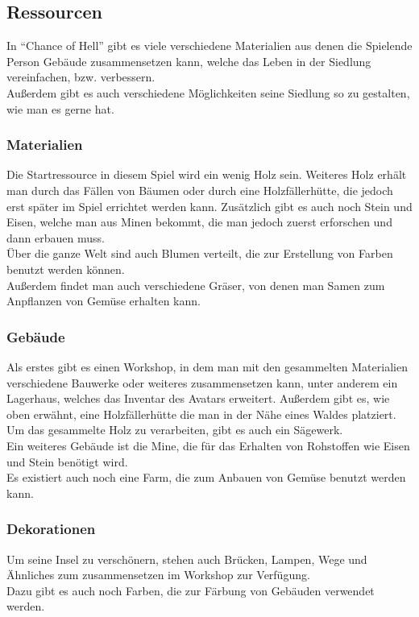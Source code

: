 \documentclass[paper=A4,pagesize=auto,12pt,headinclude=true,footinclude=true,BCOR=0mm,DIV=calc]{scrartcl}
\newcommand{\sectionspace}{
	\vspace{0.5cm}
}
\newcommand{\gametitle}{Chance of Hell}
\begin{document}


\sectionspace
\subsection{Ressourcen}\label{sec:Ressourcen}
In "`\gametitle"' gibt es viele verschiedene Materialien  aus denen die Spielende Person Gebäude zusammensetzen kann, welche das Leben in der Siedlung vereinfachen, bzw. verbessern.\\
Außerdem gibt es auch verschiedene Möglichkeiten seine Siedlung so zu gestalten, wie man es gerne hat. 

\subsubsection{Materialien}
Die Startressource in diesem Spiel wird ein wenig Holz sein. Weiteres Holz erhält man durch das Fällen von Bäumen oder durch eine Holzfällerhütte, die jedoch erst später im Spiel errichtet werden kann. Zusätzlich gibt es auch noch Stein und Eisen, welche man aus Minen bekommt, die man jedoch zuerst erforschen und dann erbauen muss.\\
Über die ganze Welt sind auch Blumen verteilt, die zur Erstellung von Farben benutzt werden können.\\
Außerdem findet man auch verschiedene Gräser, von denen man Samen zum Anpflanzen von Gemüse erhalten kann. 

\subsubsection{Gebäude}
Als erstes gibt es einen Workshop, in dem man mit den gesammelten Materialien verschiedene Bauwerke oder weiteres zusammensetzen kann, unter anderem ein Lagerhaus, welches das Inventar des Avatars erweitert. Außerdem gibt es, wie oben erwähnt, eine Holzfällerhütte die man in der Nähe eines Waldes platziert. Um das gesammelte Holz zu verarbeiten, gibt es auch ein Sägewerk.\\
Ein weiteres Gebäude ist die Mine, die für das Erhalten von Rohstoffen wie Eisen und Stein benötigt wird.\\
Es existiert auch noch eine Farm, die zum Anbauen von Gemüse benutzt werden kann.

\subsubsection{Dekorationen}
Um seine Insel zu verschönern, stehen auch Brücken, Lampen, Wege und Ähnliches zum zusammensetzen im Workshop zur Verfügung.\\
Dazu gibt es auch noch Farben, die zur Färbung von Gebäuden verwendet werden.
\end{document}
